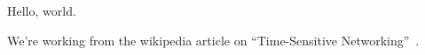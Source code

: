 Hello, world.

We're working from the wikipedia article on ``Time-Sensitive Networking''~\cite{TimeSensitiveNetworking2023}.
